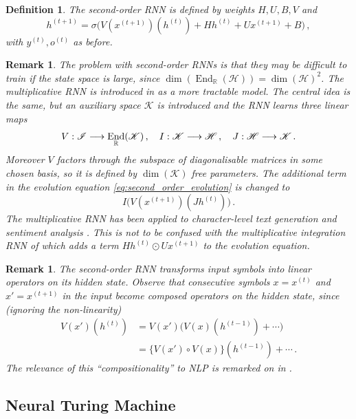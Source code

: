 \documentclass[english,letter paper,12pt,leqno]{article}
\theoremstyle{example}
\newtheorem{definition}[theorem]{Definition}
\newtheorem{remark}[theorem]{Remark}
\numberwithin{equation}{section}
\def\be{\begin{equation}}
\def\ee{\end{equation}}
\DeclareMathOperator{\End}{End}
\begin{document}
\begin{definition} The second-order RNN \cite{highorderrec,pollack} is defined by weights $H,U,B,V$ and
\be\label{eq:second_order_evolution}
h^{(t+1)} = \sigma\big( V( x^{(t+1)} )(h^{(t)}) + H h^{(t)} + U x^{(t+1)} + B\big)\,,
\ee 
with $y^{(t)}, o^{(t)}$ as before.
\end{definition}

\begin{remark} The problem with second-order RNNs is that they may be difficult to train if the state space is large, since $\dim(\End_{\mathbb{R}}(\mathscr{H})) = \dim(\mathscr{H})^2$. The \emph{multiplicative RNN} is introduced in \cite{sutskever} as a more tractable model. The central idea is the same, but an auxiliary space $\mathscr{K}$ is introduced and the RNN learns three linear maps
\be\label{eq:threelinearmaps}
V: \mathscr{I} \lto \End_{\mathbb{R}}(\mathscr{K})\,, \quad I: \mathscr{K} \lto \mathscr{H}\,, \quad J: \mathscr{H} \lto \mathscr{K}\,.
\ee
Moreover $V$ factors through the subspace of diagonalisable matrices in some chosen basis, so it is defined by $\dim(\mathscr{K})$ free parameters. The additional term in the evolution equation \eqref{eq:second_order_evolution} is changed to
\be\label{eq:new_term_mRNN}
I\big( V(x^{(t+1)})( J h^{(t)} ) \big)\,.
\ee
The multiplicative RNN has been applied to character-level text generation \cite{sutskever} and sentiment analysis \cite{irsoy}. This is not to be confused with the \emph{multiplicative integration} RNN of \cite{yuhai} which adds a term $H h^{(t)} \odot U x^{(t+1)}$ to the evolution equation.
\end{remark}

\begin{remark}
The second-order RNN transforms input symbols into linear operators on its hidden state. Observe that consecutive symbols $x = x^{(t)}$ and $x' = x^{(t+1)}$ in the input become composed operators on the hidden state, since (ignoring the non-linearity)
\begin{align*}
V(x')(h^{(t)}) &= V(x')\big( V(x)(h^{(t-1)}) + \cdots)\\
&= \big\{ V(x') \circ V(x) \big\}( h^{(t-1)} ) + \cdots\,.
\end{align*}
The relevance of this ``compositionality'' to NLP is remarked on in \cite{irsoy}.
\end{remark}

\subsection{Neural Turing Machine}\label{example:ntm}
\end{document}
